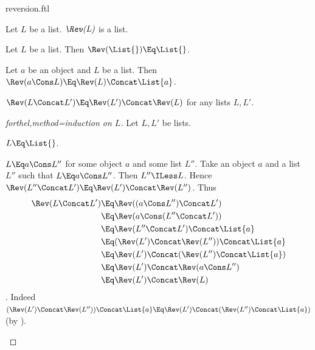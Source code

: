 \documentclass{stex}
\begin{document}
\begin{smodule}{reversion.ftl}



\begin{signature*}[forthel,for=Rev]
  Let $L$ be a list.
  $\emph{\Rev(L)}$ is a list.
\end{signature*}

\begin{axiom*}[forthel,for=Rev]
  Let $L$ be a list.
  Then $\Rev(\List{}) \Eq \List{}$.
\end{axiom*}

\begin{axiom*}[forthel,for=Rev]
  Let $a$ be an object and $L$ be a list.
  Then $\Rev(a \Cons L) \Eq \Rev(L) \Concat \List{a}$.
\end{axiom*}

\begin{proposition*}[forthel]
  $\Rev(L \Concat L') \Eq \Rev(L') \Concat \Rev(L)$ for any lists $L, L'$.
\end{proposition*}
\begin{proof}[forthel,method=induction on $L$]
  Let $L,L'$ be lists.

  \begin{case}{$L \Eq \List{}$.} \end{case}

  \begin{case}{$L \Eq a \Cons L''$ for some object $a$ and some list $L''$.}
    Take an object $a$ and a list $L''$ such that $L \Eq a \Cons L''$.
    Then $L'' \ILess L$.
    Hence $\Rev(L'' \Concat L') \Eq \Rev(L') \Concat \Rev(L'')$.
    Thus
    \begin{align*}
      \Rev(L \Concat L')
        &\Eq \Rev((a \Cons L'') \Concat L')\\
        &\Eq \Rev(a \Cons (L'' \Concat L'))\\
        &\Eq \Rev(L'' \Concat L') \Concat \List{a}\\
        &\Eq (\Rev(L') \Concat \Rev(L'')) \Concat \List{a}\\
        &\Eq \Rev(L') \Concat (\Rev(L'') \Concat \List{a})\\
        &\Eq \Rev(L') \Concat \Rev(a \Cons L'')\\
        &\Eq \Rev(L') \Concat \Rev(L)
    \end{align*}.
    Indeed $(\Rev(L') \Concat \Rev(L'')) \Concat \List{a} \Eq \Rev(L') \Concat (\Rev(L'') \Concat \List{a})$ (by ).
  \end{case}
\end{proof}


\end{smodule}
\end{document}
